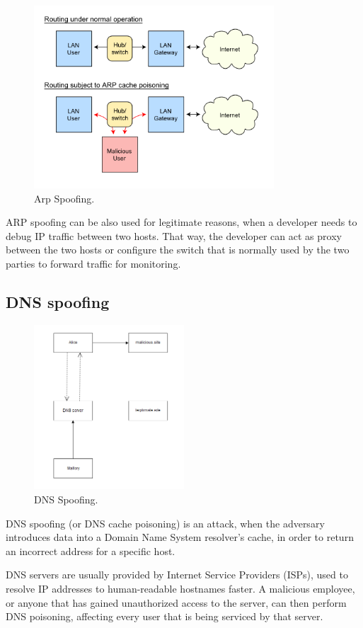 \begin{figure}[H] \caption{Arp Spoofing.} \centering \includegraphics[width=0.8\textwidth]{diagrams/arp_spoofing.png}\end{figure}

ARP spoofing can be also used for legitimate reasons, when a developer needs to debug IP traffic between two hosts. That way, the developer can act as proxy between the two hosts or configure the switch that is normally used by the two parties to forward traffic for monitoring.

\subsection{DNS spoofing}

\begin{figure}[H] \caption{DNS Spoofing.} \centering \includegraphics[width=0.5\textwidth]{diagrams/dns_spoofing.png}\end{figure}

DNS spoofing (or DNS cache poisoning) is an attack, when the adversary introduces data into a Domain Name System resolver's cache, in order to return an incorrect address for a specific host.

DNS servers are usually provided by Internet Service Providers (ISPs), used to resolve IP addresses to human-readable hostnames faster. A malicious employee, or anyone that has gained unauthorized access to the server, can then perform DNS poisoning, affecting every user that is being serviced by that server.
